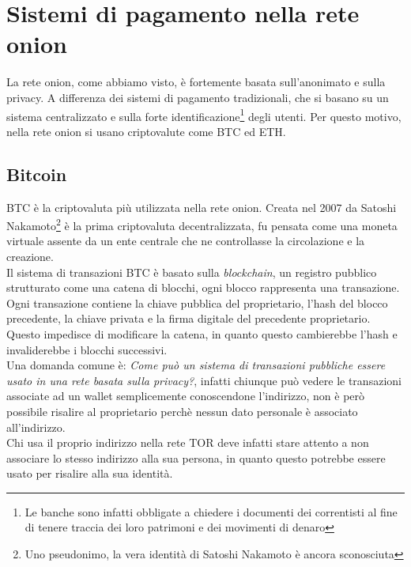 \chapter{Sistemi di pagamento nella rete onion}
\label{cap:sistemi_di_pagamento}
La rete onion, come abbiamo visto, è fortemente basata sull'anonimato e sulla privacy. 
A differenza dei sistemi di pagamento tradizionali, che si basano su un sistema centralizzato e sulla forte identificazione\footnote{Le banche sono infatti obbligate a chiedere i documenti dei correntisti al fine di tenere traccia dei loro patrimoni e dei movimenti di denaro} degli utenti. 
Per questo motivo, nella rete onion si usano criptovalute come BTC ed ETH.

\section{Bitcoin}
\label{sec:bitcoin}
BTC è la criptovaluta più utilizzata nella rete onion. 
Creata nel 2007 da Satoshi Nakamoto\footnote{Uno pseudonimo, la vera identità di Satoshi Nakamoto è ancora sconosciuta} è la prima criptovaluta decentralizzata, fu pensata come una moneta virtuale assente da un ente centrale che ne controllasse la circolazione e la creazione.\\
Il sistema di transazioni BTC è basato sulla \textit{blockchain}, un registro pubblico strutturato come una catena di blocchi, ogni blocco rappresenta una transazione.
Ogni transazione contiene la chiave pubblica del proprietario, l'hash del blocco precedente, la chiave privata e la firma digitale del precedente proprietario. 
Questo impedisce di modificare la catena, in quanto questo cambierebbe l'hash e invaliderebbe i blocchi successivi.\\
Una domanda comune è: \textit{Come può un sistema di transazioni pubbliche essere usato in una rete basata sulla privacy?}, infatti chiunque può vedere le transazioni associate ad un wallet semplicemente conoscendone l'indirizzo, non è però possibile risalire al proprietario perchè nessun dato personale è associato all'indirizzo. \\
Chi usa il proprio indirizzo nella rete TOR deve infatti stare attento a non associare lo stesso indirizzo alla sua persona, in quanto questo potrebbe essere usato per risalire alla sua identità.\\ \cite{BTCcashSystem}

